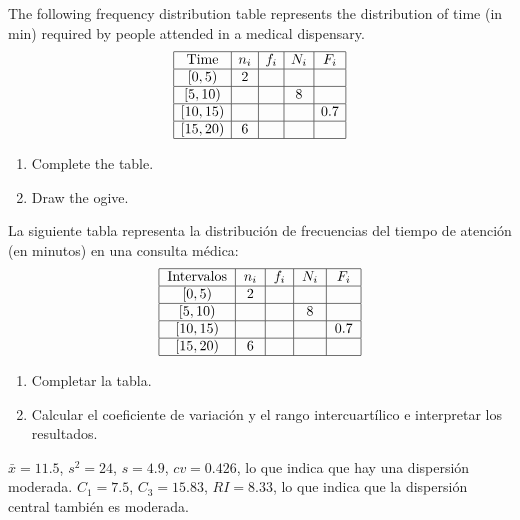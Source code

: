 {The following frequency distribution table represents the distribution of time (in min) required by people
attended in a medical dispensary.
\[
\begin{array}{|c|c|c|c|c|}
\hline \mbox{Time} & n_{i} & f_{i} & N_{i} & F_{i}\\
\hline
\left[ 0,5\right) & 2 &  &  &  \\
\hline
\left[ 5,10\right) &  &  & 8 &  \\
\hline
\left[ 10,15\right) &  & &  & 0.7 \\
\hline
\left[ 15,20\right) & 6 &  &  &\\
\hline
\end{array}
\]

\begin{enumerate}
\item Complete the table.
\item Draw the ogive.
\end{enumerate}
}
{
}
{}


{La siguiente tabla representa la distribución de frecuencias del tiempo de atención (en minutos) en una consulta médica:
\[
\begin{tabular}{|c|c|c|c|c|}
\hline
Intervalos & $n_{i}$ & $f_{i}$ & $N_{i}$ & $F_{i}$ \\ \hline
$\left[ 0,5\right) $ & 2 &  &  &  \\ \hline
$\left[ 5,10\right) $ &  &  & 8 &  \\ \hline
$\left[ 10,15\right) $ &  &  &  & 0.7 \\ \hline
$\left[ 15,20\right) $ & 6 &  &  &  \\ \hline
\end{tabular}
\]
\begin{enumerate}
\item Completar la tabla.
\item Calcular el coeficiente de variación y el rango intercuartílico e interpretar los resultados.
\end{enumerate}
}
{$\bar x= 11.5$, $s^2= 24$, $s=4.9$, $cv=0.426$, lo que indica que hay una dispersión moderada. $C_1=7.5$, $C_3=15.83$, $RI=8.33$, lo que indica que la dispersión central también es moderada.
}
{}


